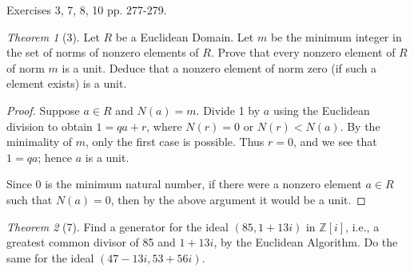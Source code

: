 \documentclass[12pt]{article}
\theoremstyle{remark}
\theoremstyle{named}
\newtheorem*{theorem}{Theorem}
\newcommand{\Z}{\mathbb Z}
\begin{document}
Exercises 3, 7, 8, 10 pp. 277-279.

\begin{theorem}[3]
    Let \(R\) be a Euclidean Domain. Let \(m\) be the minimum integer in the set of norms of nonzero elements of \(R\). Prove that every nonzero element of \(R\) of norm \(m\) is a unit. Deduce that a nonzero element of norm zero (if such a element exists) is a unit.
\end{theorem}

\begin{proof}
    Suppose \(a \in R\) and \(N(a) = m\). Divide 1 by \(a\) using the Euclidean division to obtain \(1 = qa + r\), where \(N(r) = 0\) or \(N(r) < N(a)\). By the minimality of \(m\), only the first case is possible. Thus \(r = 0\), and we see that \(1 = qa\); hence \(a\) is a unit.
    
    Since \(0\) is the minimum natural number, if there were a nonzero element \(a \in R\) such that \(N(a) = 0\), then by the above argument it would be a unit.
\end{proof}

\begin{theorem}[7]
    Find a generator for the ideal \((85, 1 + 13i)\) in \(\Z[i]\), i.e., a greatest common divisor of 85 and \(1 + 13i\), by the Euclidean Algorithm. Do the same for the ideal \((47 - 13i, 53 + 56i)\).
\end{theorem}
\end{document}
